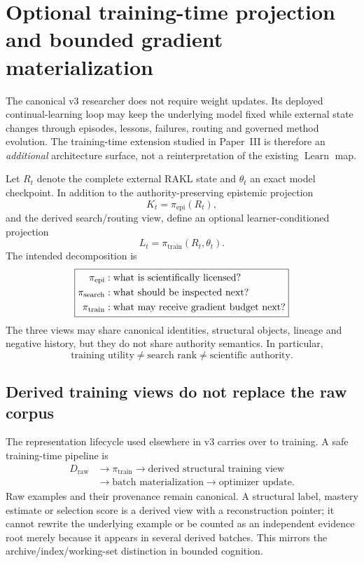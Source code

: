 \section{Optional training-time projection and bounded gradient materialization}
\label{sec:training-time-projection}

The canonical v3 researcher does not require weight updates.  Its deployed continual-learning loop may keep the underlying model fixed while external state changes through episodes, lessons, failures, routing and governed method evolution.  The training-time extension studied in Paper~III is therefore an \emph{additional} architecture surface, not a reinterpretation of the existing $\operatorname{Learn}$ map.

Let $R_t$ denote the complete external RAKL state and $\theta_t$ an exact model checkpoint.  In addition to the authority-preserving epistemic projection
\[
K_t=\pi_{\mathrm{epi}}(R_t),
\]
and the derived search/routing view, define an optional learner-conditioned projection
\[
L_t=\pi_{\mathrm{train}}(R_t,\theta_t).
\]
The intended decomposition is
\[
\boxed{%
\begin{aligned}
\pi_{\mathrm{epi}} &: \text{what is scientifically licensed?}\\
\pi_{\mathrm{search}} &: \text{what should be inspected next?}\\
\pi_{\mathrm{train}} &: \text{what may receive gradient budget next?}
\end{aligned}}
\]
The three views may share canonical identities, structural objects, lineage and negative history, but they do not share authority semantics.  In particular,
\[
\text{training utility}\neq\text{search rank}\neq\text{scientific authority}.
\]

\subsection{Derived training views do not replace the raw corpus}

The representation lifecycle used elsewhere in v3 carries over to training.  A safe training-time pipeline is
\[
\begin{aligned}
D_{\mathrm{raw}}
&\longrightarrow \pi_{\mathrm{train}}
\longrightarrow \text{derived structural training view} \\
&\longrightarrow \text{batch materialization}
\longrightarrow \text{optimizer update}.
\end{aligned}
\]
Raw examples and their provenance remain canonical.  A structural label, mastery estimate or selection score is a derived view with a reconstruction pointer; it cannot rewrite the underlying example or be counted as an independent evidence root merely because it appears in several derived batches.  This mirrors the archive/index/working-set distinction in bounded cognition.

